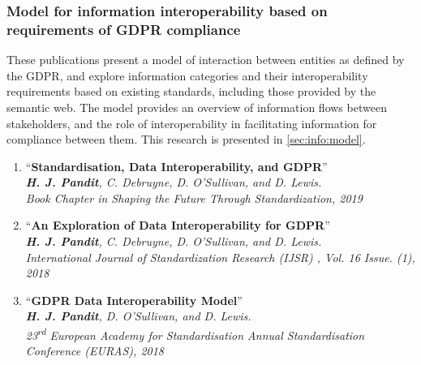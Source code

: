 \subsubsection{Model for information interoperability based on requirements of GDPR compliance}
These publications present a model of interaction between entities as defined by the GDPR, and explore information categories and their interoperability requirements based on existing standards, including those provided by the semantic web.
The model provides an overview of information flows between stakeholders, and the role of interoperability in facilitating information for compliance between them. This research is presented in \autoref{sec:info:model}.
\begin{enumerate}[resume]
    \item ``\textbf{Standardisation, Data Interoperability, and GDPR}'' \cite{pandit_exploration_2018} \\
    \textit{\textbf{H. J. Pandit}, C. Debruyne, D. O’Sullivan, and D. Lewis.} \\ 
    \textit{Book Chapter in Shaping the Future Through Standardization, 2019}
    \item ``\textbf{An Exploration of Data Interoperability for GDPR}'' \cite{pandit_exploration_2018} \\
    \textit{\textbf{H. J. Pandit}, C. Debruyne, D. O’Sullivan, and D. Lewis.} \\ 
    \textit{International Journal of Standardization Research (IJSR) , Vol. 16 Issue. (1), 2018}
    \item ``\textbf{GDPR Data Interoperability Model}'' \cite{pandit_gdpr_2018} \\
    \textit{\textbf{H. J. Pandit}, D. O’Sullivan, and D. Lewis.} \\ 
    \textit{23\textsuperscript{rd} European Academy for Standardisation Annual Standardisation Conference (EURAS), 2018}
\end{enumerate}


